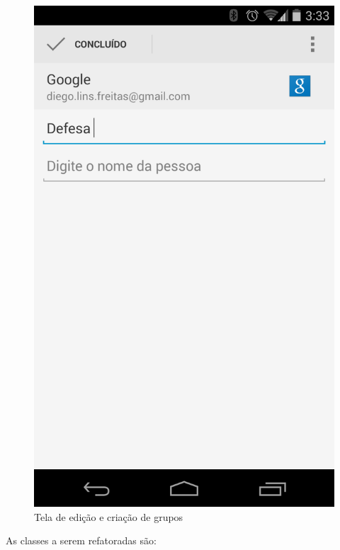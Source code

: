 \documentclass[conference]{IEEEtran}
\begin{document}
\begin{figure}[htb]
\begin{minipage}[b]{0.45\linewidth}
	\end{minipage}
\quad
	\begin{minipage}[b]{0.45\linewidth}
		\begin{center} 
			\includegraphics[scale=0.18]{img/contacts_edit.png}
		\end{center}
		\caption{\label{fig:groups_edit} Tela de edição e criação de grupos}
		 
	\end{minipage}
\end{figure}


As classes a serem refatoradas são:
\end{document}
